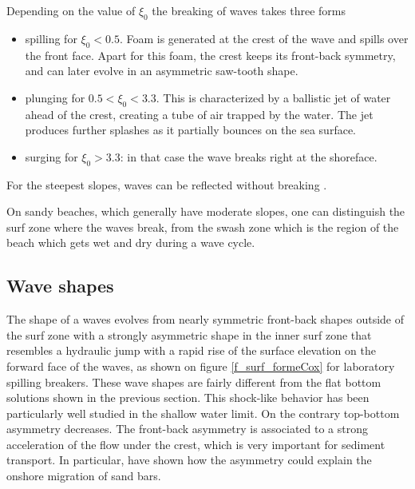 Depending on the value of $\xi_0$ the breaking of waves takes three forms
\begin{itemize}
 \item spilling for $\xi_0<0.5$. Foam is generated at the crest of the wave and spills over the front face. Apart for this foam, the crest keeps 
 its front-back symmetry, and can later evolve in  an asymmetric saw-tooth shape. 
 \item plunging for $0.5<\xi_0<3.3$. This is characterized by a ballistic jet of water ahead of the crest, creating a tube of air 
 trapped by the water. The jet produces further splashes as it partially bounces on the sea surface.
 \item surging for  $\xi_0>3.3$: in that case the wave breaks right at the shoreface. 
\end{itemize}
For the steepest slopes, waves can be reflected without breaking \citep{Carrier&Greenspan1958}. 

On sandy beaches, which generally have moderate slopes, one can distinguish the surf zone where the waves break, from the swash zone which is
the region of the beach which gets wet and dry during a wave cycle. 


\subsection{Wave shapes}
The shape of a waves evolves from nearly symmetric front-back shapes outside of the surf zone
with a strongly asymmetric shape in the inner surf zone that resembles a hydraulic jump with a rapid rise of the surface elevation on 
the forward face of the waves, as shown on figure \ref{f_surf_formeCox} for laboratory spilling breakers. These wave  shapes are fairly different from the flat bottom 
solutions shown in the previous section. This shock-like behavior has 
been particularly well studied in the shallow water limit\citep{Bonneton&al2004}.
On the contrary top-bottom asymmetry decreases. The front-back asymmetry is associated to a strong acceleration of the flow 
under the crest, which is very important for sediment transport. In particular, \cite{Hoefel&Elgar2003} have shown how the asymmetry  
could explain the onshore migration of sand bars. 

